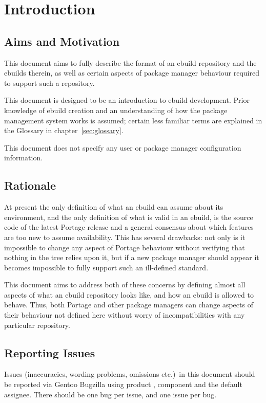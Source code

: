 \chapter{Introduction}

\section{Aims and Motivation}

This document aims to fully describe the format of an ebuild repository and the ebuilds therein, as
well as certain aspects of package manager behaviour required to support such a repository.

This document is  designed to be an introduction to ebuild development. Prior knowledge of
ebuild creation and an understanding of how the package management system works is assumed; certain
less familiar terms are explained in the Glossary in chapter~\ref{sec:glossary}.

This document does not specify any user or package manager configuration information.

\section{Rationale}

At present the only definition of what an ebuild can assume about its environment,
and the only definition of what is valid in an ebuild, is the source code of the latest Portage release
and a general consensus about which features are too new to assume availability. This has several
drawbacks: not only is it impossible to change any aspect of Portage behaviour without verifying
that nothing in the tree relies upon it, but if a new package manager should appear it becomes
impossible to fully support such an ill-defined standard.

This document aims to address both of these concerns by defining almost all aspects of what an
ebuild repository looks like, and how an ebuild is allowed to behave. Thus, both Portage and other
package managers can change aspects of their behaviour not defined here without worry of
incompatibilities with any particular repository.

\section{Reporting Issues}

Issues (inaccuracies, wording problems, omissions etc.)\ in this document should be reported via
Gentoo Bugzilla using product , component  and the default
assignee. There should be one bug per issue, and one issue per bug.

